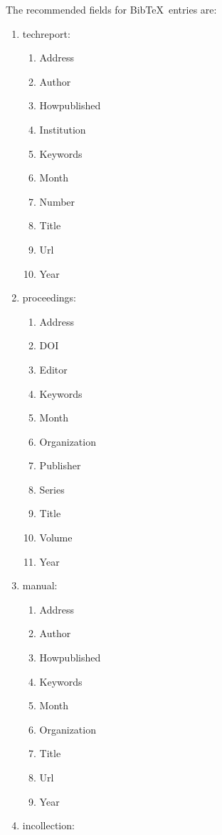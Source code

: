 \documentclass[letter,12pt]{article}
\begin{document}
The recommended fields for {\sc Bib}\TeX\ entries are: \vspace{-0.3cm}
\begin{enumerate} \itemsep -4pt
\item techreport: \vspace{-0.3cm}
	\begin{enumerate} \itemsep -2pt
	\item Address
	\item Author
	\item Howpublished
	\item Institution
	\item Keywords
	\item Month
	\item Number
	\item Title
	\item Url
	\item Year
	\end{enumerate}
\item proceedings: \vspace{-0.3cm}
	\begin{enumerate} \itemsep -2pt
	\item Address
	\item DOI
	\item Editor
	\item Keywords
	\item Month
	\item Organization
	\item Publisher
	\item Series
	\item Title
	\item Volume
	\item Year
	\end{enumerate}
\item manual: \vspace{-0.3cm}
	\begin{enumerate} \itemsep -2pt
	\item Address
	\item Author
	\item Howpublished
	\item Keywords
	\item Month
	\item Organization
	\item Title
	\item Url
	\item Year
	\end{enumerate}
\item incollection: \vspace{-0.3cm}

\end{enumerate}
\end{document}
